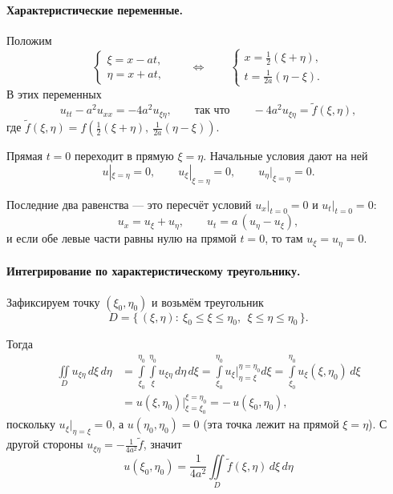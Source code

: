 \paragraph{Характеристические переменные.} Положим
\[
  \begin{cases} \xi = x - at, \\ \eta = x + at, \end{cases}
  \qquad\Longleftrightarrow\qquad
  \begin{cases} x = \tfrac12(\xi + \eta), \\[2pt] t = \tfrac{1}{2a}(\eta - \xi). \end{cases}
\]
В этих переменных
\[
  u_{tt} - a^2 u_{xx} = -4a^2 u_{\xi\eta},
  \qquad\text{так что}\qquad
  -4a^2 u_{\xi\eta} = \widetilde f(\xi,\eta),
\]
где $\widetilde f(\xi,\eta) = f\!\left(\tfrac12(\xi+\eta),\ \tfrac{1}{2a}(\eta-\xi)\right)$.

Прямая $t = 0$ переходит в прямую $\xi = \eta$. Начальные условия дают на ней
\[
  u|_{\xi=\eta} = 0, \qquad u_\xi|_{\xi=\eta} = 0, \qquad u_\eta|_{\xi=\eta} = 0 .
\]

\begin{idea}
Последние два равенства — это пересчёт условий $u_x|_{t=0} = 0$ и $u_t|_{t=0}=0$:
\[
  u_x = u_\xi + u_\eta, \qquad u_t = a\,(u_\eta - u_\xi),
\]
и если обе левые части равны нулю на прямой $t=0$, то там $u_\xi = u_\eta = 0$.
\end{idea}

\paragraph{Интегрирование по характеристическому треугольнику.}
Зафиксируем точку $(\xi_0, \eta_0)$ и возьмём треугольник
\[
  D = \{\, (\xi,\eta) : \ \xi_0 \le \xi \le \eta_0, \ \ \xi \le \eta \le \eta_0 \,\}.
\]


Тогда
\begin{align*}
  \iint\limits_D u_{\xi\eta} \, d\xi\, d\eta
  &= \int\limits_{\xi_0}^{\eta_0} \!\! \int\limits_{\xi}^{\eta_0}
     u_{\xi\eta}\, d\eta\, d\xi
   = \int\limits_{\xi_0}^{\eta_0} u_\xi \Big|_{\eta=\xi}^{\eta=\eta_0} d\xi
   = \int\limits_{\xi_0}^{\eta_0} u_\xi(\xi, \eta_0)\, d\xi \\[4pt]
  &= u(\xi,\eta_0)\Big|_{\xi=\xi_0}^{\xi=\eta_0}
   = -\,u(\xi_0, \eta_0),
\end{align*}
поскольку $u_\xi|_{\eta=\xi} = 0$, а $u(\eta_0,\eta_0) = 0$ (эта точка лежит на
прямой $\xi=\eta$). С другой стороны $u_{\xi\eta} = -\tfrac{1}{4a^2}\widetilde f$,
значит
\[
  \boxed{\ u(\xi_0,\eta_0) = \frac{1}{4a^2} \iint\limits_D \widetilde f(\xi,\eta)\,
  d\xi\, d\eta \ }
\]

